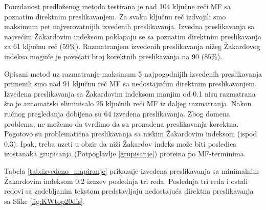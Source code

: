 Pouzdanost predloženog metoda testirana je nad 104 ključne reči MF sa poznatim
direktnim preslikavanjem.  Za svaku ključnu reč izdvojili smo maksimum pet
najverovatnijih izvedenih preslikavanja. Izvedna preslikavanja sa najvećim Žakardovim
indeksom poklapaju se sa poznatim direktnim preslikavanja za 61 ključnu reč
($59\%$). Razmatranjem izvedenih preslikavanja nižeg Žakardovog indeksa moguće
je povećati broj korektnih preslikavanja na 90 ($85\%$).

Opisani metod uz razmatranje maksimum 5 najpogodnijih izvedenih preslikavanja
primenili smo nad 91 ključnu reč MF sa nedostajućim direktnim preslikavanjem.
Izvedena preslikavanja sa Žakardovim indeksom manjim od 0.1 nisu razmatrana što
je automatski eliminisalo 25 ključnih reči MF iz daljeg razmatranja. Nakon
ručnog pregledanja dobijena su 64 izvedena preslikavanja. Zbog domena problema,
ne možemo da tvrdimo da su pronađena preslikavanja korektna. Pogotovo su
problematična preslikavanja sa niskim Žakardovim indeksom (ispod 0.3). Ipak,
treba uzeti u obzir da niži Žakardov indeks može biti posledica izostanaka
grupisanja (Potpoglavlje \ref{grupisanje}) proteina po MF-terminima.

Tabela \ref{tab:izvedeno_mapiranje} prikazuje izvedena preslikavanja sa
minimalnim Žakardovim indeksom 0.2 izuzev poslednja tri reda. Poslednja tri
reda i ostali redovi sa zadebljanim tekstom  predstavljaju
nedostajuća direktna preslikavanja sa Slike \ref{fig:KWtop20dis}.



